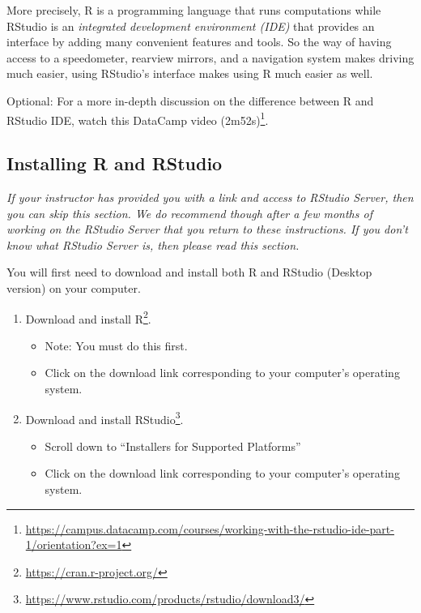 \documentclass[12pt,]{krantz}
\providecommand{\tightlist}{%
  \setlength{\itemsep}{0pt}\setlength{\parskip}{0pt}}
\renewcommand{\href}[2]{#2\footnote{\url{#1}}}
\theoremstyle{definition}
\theoremstyle{definition}
\theoremstyle{definition}
\theoremstyle{remark}
\begin{document}
More precisely, R is a programming language that runs computations while
RStudio is an \emph{integrated development environment (IDE)} that
provides an interface by adding many convenient features and tools. So
the way of having access to a speedometer, rearview mirrors, and a
navigation system makes driving much easier, using RStudio's interface
makes using R much easier as well.

Optional: For a more in-depth discussion on the difference between R and
RStudio IDE, watch this
\href{https://campus.datacamp.com/courses/working-with-the-rstudio-ide-part-1/orientation?ex=1}{DataCamp
video (2m52s)}.

\subsection{Installing R and RStudio}\label{installing-r-and-rstudio}

\emph{If your instructor has provided you with a link and access to
RStudio Server, then you can skip this section. We do recommend though
after a few months of working on the RStudio Server that you return to
these instructions. If you don't know what RStudio Server is, then
please read this section.}

You will first need to download and install both R and RStudio (Desktop
version) on your computer.

\begin{enumerate}
\def\labelenumi{\arabic{enumi}.}
\tightlist
\item
  \href{https://cran.r-project.org/}{Download and install R}.

  \begin{itemize}
  \tightlist
  \item
    Note: You must do this first.
  \item
    Click on the download link corresponding to your computer's
    operating system.
  \end{itemize}
\item
  \href{https://www.rstudio.com/products/rstudio/download3/}{Download
  and install RStudio}.

  \begin{itemize}
  \tightlist
  \item
    Scroll down to ``Installers for Supported Platforms''
  \item
    Click on the download link corresponding to your computer's
    operating system.
  \end{itemize}
\end{enumerate}
\end{document}
